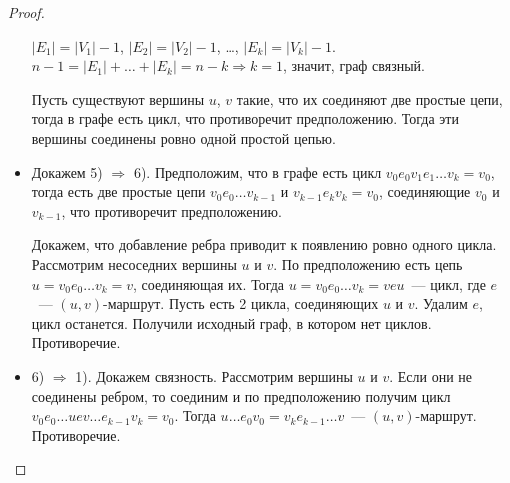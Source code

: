 \begin{proof}
\begin{itemize}
	$|E_1| = |V_1| - 1$, $|E_2| = |V_2| - 1$, \ldots, $|E_k| = |V_k| - 1$. $n - 1 = |E_1| + \ldots + |E_k| = n - k \Rightarrow k = 1$, значит, граф связный.
	
	Пусть существуют вершины $u$, $v$ такие, что их соединяют две простые цепи, тогда в графе есть цикл, что противоречит предположению. Тогда эти вершины соединены ровно одной простой цепью.
	
	\item Докажем 5) $\Rightarrow$ 6). Предположим, что в графе есть цикл $v_0 e_0 v_1 e_1 \ldots v_k = v_0$, тогда есть две простые цепи $v_0 e_0 \ldots v_{k-1}$ и $v_{k-1} e_k v_k = v_0$, соединяющие $v_0$ и $v_{k-1}$, что противоречит предположению.
	
	Докажем, что добавление ребра приводит к появлению ровно одного цикла. Рассмотрим несоседних вершины $u$ и $v$. По предположению есть цепь $u = v_0 e_0 \ldots v_k = v$, соединяющая их. Тогда $u = v_0 e_0 \ldots v_k = v e u$~--- цикл, где $e$~--- $(u, v)$-маршрут. Пусть есть 2 цикла, соединяющих $u$ и $v$. Удалим $e$, цикл останется. Получили исходный граф, в котором нет циклов. Противоречие.
	
	\item 6) $\Rightarrow$ 1). Докажем связность. Рассмотрим вершины $u$ и $v$. Если они не соединены ребром, то соединим и по предположению получим цикл $v_0 e_0 \ldots u e v \ldots e_{k-1} v_k = v_0$. Тогда $u \ldots e_0 v_0 = v_k e_{k-1} \ldots v$~--- $(u, v)$-маршрут. Противоречие.
\end{itemize}
\end{proof}